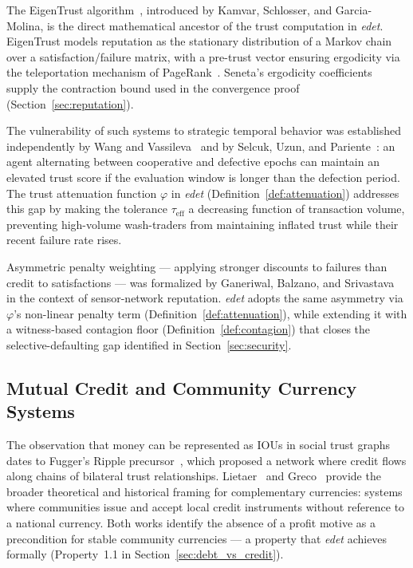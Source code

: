 \documentclass[11pt]{article}
\begin{document}
The EigenTrust algorithm~\cite{kamvar2003}, introduced by Kamvar, Schlosser, and Garcia-Molina, is the direct mathematical ancestor of the trust computation in \emph{edet}. EigenTrust models reputation as the stationary distribution of a Markov chain over a satisfaction/failure matrix, with a pre-trust vector ensuring ergodicity via the teleportation mechanism of PageRank~\cite{page1999}. Seneta's ergodicity coefficients~\cite{seneta1979} supply the contraction bound used in the convergence proof (Section~\ref{sec:reputation}).

The vulnerability of such systems to strategic temporal behavior was established independently by Wang and Vassileva~\cite{wang2003} and by Selcuk, Uzun, and Pariente~\cite{selcuk2004}: an agent alternating between cooperative and defective epochs can maintain an elevated trust score if the evaluation window is longer than the defection period. The trust attenuation function $\varphi$ in \emph{edet} (Definition~\ref{def:attenuation}) addresses this gap by making the tolerance $\tau_{\text{eff}}$ a decreasing function of transaction volume, preventing high-volume wash-traders from maintaining inflated trust while their recent failure rate rises.

Asymmetric penalty weighting --- applying stronger discounts to failures than credit to satisfactions --- was formalized by Ganeriwal, Balzano, and Srivastava~\cite{ganeriwal2008} in the context of sensor-network reputation. \emph{edet} adopts the same asymmetry via $\varphi$'s non-linear penalty term (Definition~\ref{def:attenuation}), while extending it with a witness-based contagion floor (Definition~\ref{def:contagion}) that closes the selective-defaulting gap identified in Section~\ref{sec:security}.

\subsection{Mutual Credit and Community Currency Systems}

The observation that money can be represented as IOUs in social trust graphs dates to Fugger's Ripple precursor~\cite{fugger2004}, which proposed a network where credit flows along chains of bilateral trust relationships. Lietaer~\cite{lietaer2001} and Greco~\cite{greco2009} provide the broader theoretical and historical framing for complementary currencies: systems where communities issue and accept local credit instruments without reference to a national currency. Both works identify the absence of a profit motive as a precondition for stable community currencies --- a property that \emph{edet} achieves formally (Property~1.1 in Section~\ref{sec:debt_vs_credit}).
\end{document}
